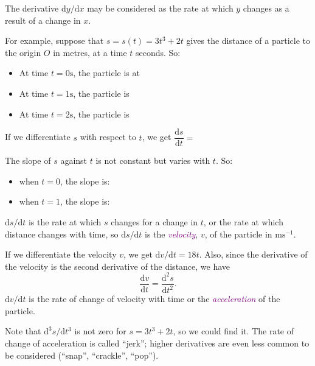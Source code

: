 \documentclass[
  english,
  11pt,
  oneside]{book}
\providecommand{\tightlist}{%
  \setlength{\itemsep}{0pt}\setlength{\parskip}{0pt}}
\newcommand{\slide}{}
\theoremstyle{definition}
\theoremstyle{definition}
\theoremstyle{definition}
\theoremstyle{definition}
\theoremstyle{remark}
\begin{document}
\begin{slidesonly}

The derivative \(\mathrm{d}y/\mathrm{d} x\) may be considered as the rate at which \(y\) changes as a result of a change in \(x\).

For example, suppose that \(s=s(t)=3t^3 + 2t\) gives the distance of a particle to the origin \(O\) in metres, at a time \(t\) seconds. So:

\begin{itemize}
\tightlist
\item
  At time \(t = 0\text{s}\), the particle is at
\item
  At time \(t = 1\text{s}\), the particle is
\item
  At time \(t = 2\text{s}\), the particle is
\end{itemize}

If we differentiate \(s\) with respect to \(t\), we get \(\dfrac{\mathrm{d} s}{\mathrm{d} t} =\)

The slope of \(s\) against \(t\) is not constant but varies with \(t\). So:

\begin{itemize}
\tightlist
\item
  when \(t = 0\), the slope is:
\item
  when \(t = 1\), the slope is:
\end{itemize}

\end{slidesonly}

\slide

\(\mathrm{d} s/\mathrm{d} t\) is the rate at which \(s\) changes for a change in \(t\), or the rate at which distance changes with time, so \(\mathrm{d} s/\mathrm{d} t\) is the \textcolor{purple}{\em velocity}, \(v\), of the particle in \(\text{m}\text{s}^{-1}\).

If we differentiate the velocity \(v\), we get \(\mathrm{d} v/\mathrm{d} t = 18t\). Also, since the derivative of the velocity is the second derivative of the distance, we have
\[
\frac{\mathrm{d} v}{\mathrm{d} t}= \frac{\mathrm{d}^{2}s}{\mathrm{d}t^2}.
\]
\(\mathrm{d} v/\mathrm{d} t\) is the rate of change of velocity with time or the \textcolor{purple}{\em acceleration} of the particle.

Note that \(\mathrm{d}^{3}s/\mathrm{d} t^{3}\) is not zero for \(s = 3t^3 + 2t\), so we could find it. The rate of change of acceleration is called ``jerk''; higher derivatives are even less common to be considered (``snap'', ``crackle'', ``pop'').
\slide
\end{document}
